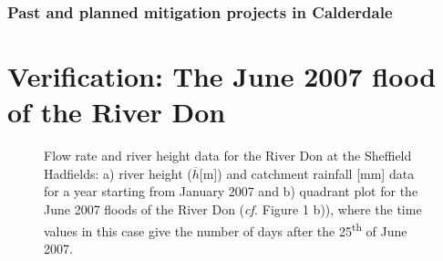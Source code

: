 \documentclass[11pt,a4paper]{article}
\begin{document}
\subsubsection{Past and planned mitigation projects in Calderdale}

\section{Verification: The June 2007 flood of the River Don}
\begin{figure}[H]
\centering
{}
\hfill
{}
\caption{Flow rate and river height data for the River Don at the Sheffield Hadfields: a) river height ($\overline{h}$[m]) \cite{Calder-Don} and catchment rainfall [mm] data \cite{NRFA} for a year starting from January 2007 and b) quadrant plot for the June 2007 floods of the River Don (\textit{cf.} Figure 1 b)), where the time values in this case give the number of days after the 25\textsuperscript{th} of June 2007.}
\end{figure}
\end{document}
